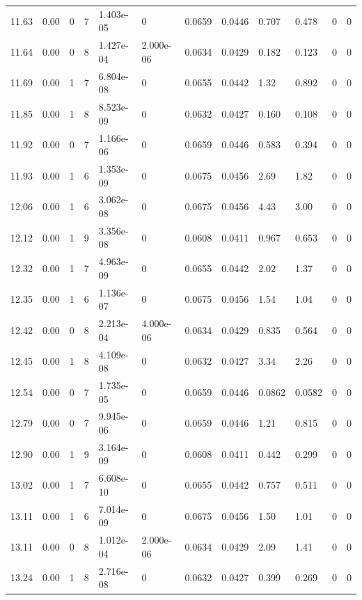 \documentclass[preview]{standalone}
\begin{document}
{{{{\begin{tabular}{L{1.2cm}C{1.2cm} C{0.3cm}C{0.5cm} C{1.4cm}C{1.4cm} C{1.4cm}C{1.4cm} C{1.6cm}C{1.6cm} C{1.6cm}C{1.6cm}}
  11.63  &  0.00  & 0     &  7 &  1.403e-05  & 0  &  0.0659&   0.0446& 0.707 & 0.478   &  0 & 0  \\ 
  11.64  &  0.00  & 0     &  8 &  1.427e-04  & 2.000e-06  &  0.0634&   0.0429& 0.182 & 0.123   &  0 & 0  \\ 
  11.69  &  0.00  & 1     &  7 &  6.804e-08  & 0  &  0.0655&   0.0442& 1.32 & 0.892   &  0 & 0  \\ 
  11.85  &  0.00  & 1     &  8 &  8.523e-09  & 0  &  0.0632&   0.0427& 0.160 & 0.108   &  0 & 0  \\ 
  11.92  &  0.00  & 0     &  7 &  1.166e-06  & 0  &  0.0659&   0.0446& 0.583 & 0.394   &  0 & 0  \\ 
  11.93  &  0.00  & 1     &  6 &  1.353e-09  & 0  &  0.0675&   0.0456& 2.69 & 1.82   &  0 & 0  \\ 
  12.06  &  0.00  & 1     &  6 &  3.062e-08  & 0  &  0.0675&   0.0456& 4.43 & 3.00   &  0 & 0  \\ 
  12.12  &  0.00  & 1     &  9 &  3.356e-08  & 0  &  0.0608&   0.0411& 0.967 & 0.653   &  0 & 0  \\ 
  12.32  &  0.00  & 1     &  7 &  4.963e-09  & 0  &  0.0655&   0.0442& 2.02 & 1.37   &  0 & 0  \\ 
  12.35  &  0.00  & 1     &  6 &  1.136e-07  & 0  &  0.0675&   0.0456& 1.54 & 1.04   &  0 & 0  \\ 
  12.42  &  0.00  & 0     &  8 &  2.213e-04  & 4.000e-06  &  0.0634&   0.0429& 0.835 & 0.564   &  0 & 0  \\ 
  12.45  &  0.00  & 1     &  8 &  4.109e-08  & 0  &  0.0632&   0.0427& 3.34 & 2.26   &  0 & 0  \\ 
  12.54  &  0.00  & 0     &  7 &  1.735e-05  & 0  &  0.0659&   0.0446& 0.0862 & 0.0582   &  0 & 0  \\ 
  12.79  &  0.00  & 0     &  7 &  9.945e-06  & 0  &  0.0659&   0.0446& 1.21 & 0.815   &  0 & 0  \\ 
  12.90  &  0.00  & 1     &  9 &  3.164e-09  & 0  &  0.0608&   0.0411& 0.442 & 0.299   &  0 & 0  \\ 
  13.02  &  0.00  & 1     &  7 &  6.608e-10  & 0  &  0.0655&   0.0442& 0.757 & 0.511   &  0 & 0  \\ 
  13.11  &  0.00  & 1     &  6 &  7.014e-09  & 0  &  0.0675&   0.0456& 1.50 & 1.01   &  0 & 0  \\ 
  13.11  &  0.00  & 0     &  8 &  1.012e-04  & 2.000e-06  &  0.0634&   0.0429& 2.09 & 1.41   &  0 & 0  \\ 
  13.24  &  0.00  & 1     &  8 &  2.716e-08  & 0  &  0.0632&   0.0427& 0.399 & 0.269   &  0 & 0  \\ 

\end{tabular}}}}}
\end{document}
